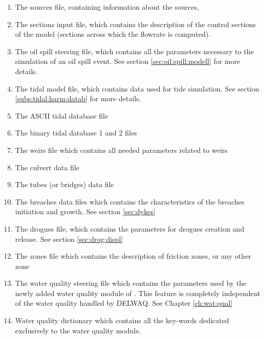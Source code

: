 \begin{enumerate}
\item  The sources file, containing information about the sources,

\item  The sections input file, which contains the description of the control sections of the model (sections across which the flowrate is computed).

\item  The oil spill steering file, which contains all the parameters necessary to the simulation of an oil spill event.  See section \ref{sec:oil:spill:modell} for more details.

\item  The tidal model file, which contains data used for tide simulation. See section \ref{subs:tidal:harm:datab} for more details.

\item  The ASCII tidal database file

\item  The binary tidal database 1 and 2 files

\item  The weirs file which contains all needed parameters related to weirs

\item  The culvert data file

\item  The tubes (or bridges) data file

\item  The breaches data files which contains the characteristics of the breaches initiation and growth. See section \ref{sec:dykes}

\item  The drogues file, which contains the parameters for drogues creation and release. See section \ref{sec:drog:displ}

\item  The zones file which contains the description of friction zones, or any other zone

\item  The water quality steering file which contains the parameters used by the newly added water quality module of . This feature is completely independent of the water quality handled by DELWAQ. See Chapter \ref{ch:wat:qual}

\item  Water quality dictionary which contains all the key-words dedicated exclusively to the water quality module.
\end{enumerate}



